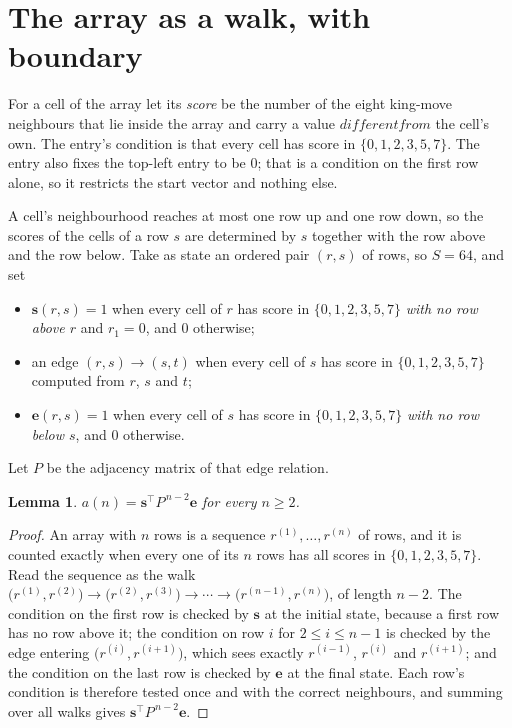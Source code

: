 \documentclass[11pt,a4paper]{article}
\theoremstyle{plain}
\newtheorem{lemma}[theorem]{Lemma}
\theoremstyle{definition}
\begin{document}
\section{The array as a walk, with boundary}

For a cell of the array let its \emph{score} be the number of the eight king-move neighbours that lie inside
the array and carry a value $different from$ the cell's own. The entry's condition is that every cell
has score in $\{0,1,2,3,5,7\}$. The entry also fixes the top-left entry to be $0$; that is a condition on the first row alone, so it restricts the start vector and nothing else.

A cell's neighbourhood reaches at most one row up and one row down, so the scores of the
cells of a row $s$ are determined by $s$ together with the row above and the row below.
Take as state an ordered pair $(r,s)$ of rows, so $S=64$, and set
\begin{itemize}
\item $\mathbf{s}(r,s)=1$ when every cell of $r$ has score in $\{0,1,2,3,5,7\}$ \emph{with no row
above $r$} and $r_1=0$, and $0$ otherwise;
\item an edge $(r,s)\to(s,t)$ when every cell of $s$ has score in $\{0,1,2,3,5,7\}$ computed from
$r$, $s$ and $t$;
\item $\mathbf{e}(r,s)=1$ when every cell of $s$ has score in $\{0,1,2,3,5,7\}$ \emph{with no row
below $s$}, and $0$ otherwise.
\end{itemize}
Let $P$ be the adjacency matrix of that edge relation.

\begin{lemma}\label{lem:walk}
$a(n)=\mathbf{s}^{\!\top}P^{\,n-2}\mathbf{e}$ for every $n\ge2$.
\end{lemma}

\begin{proof}
An array with $n$ rows is a sequence $r^{(1)},\dots,r^{(n)}$ of rows, and it is counted
exactly when every one of its $n$ rows has all scores in $\{0,1,2,3,5,7\}$. Read the sequence as the
walk $\bigl(r^{(1)},r^{(2)}\bigr)\to\bigl(r^{(2)},r^{(3)}\bigr)\to\cdots\to
\bigl(r^{(n-1)},r^{(n)}\bigr)$, of length $n-2$. The condition on the first row is
checked by $\mathbf{s}$ at the initial state, because a first row has no row above it; the
condition on row $i$ for $2\le i\le n-1$ is checked by the edge entering
$\bigl(r^{(i)},r^{(i+1)}\bigr)$, which sees exactly $r^{(i-1)}$, $r^{(i)}$ and
$r^{(i+1)}$; and the condition on the last row is checked by $\mathbf{e}$ at the final
state. Each row's condition is therefore tested once and with the correct neighbours, and
summing over all walks gives $\mathbf{s}^{\!\top}P^{\,n-2}\mathbf{e}$.
\end{proof}
\end{document}
